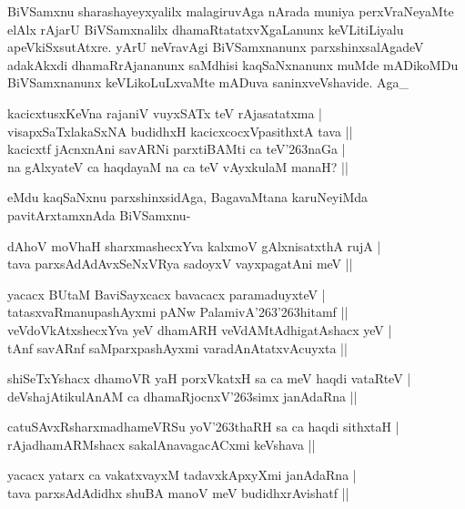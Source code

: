 \noindent
BiVSamxnu sharashayeyxyalilx malagiruvAga nArada muniya perxVraNeyaMte elAlx rAjarU BiVSamxnalilx dhamaRtatatxvXgaLanunx keVLitiLiyalu apeVkiSxsutAtxre. yArU neVravAgi BiVSamxnanunx parxshinxsalAgadeV adakAkxdi dhamaRrAjananunx saMdhisi kaqSaNxnanunx muMde mADikoMDu BiVSamxnanunx keVLikoLuLxvaMte mADuva saninxveVshavide. Aga\_

\begin{shloka}
kacicxtusxKeVna rajaniV vuyxSATx teV rAjasatatxma |\\\label{162}
visapxSaTxlakaSxNA budidhxH kacicxcocxVpasithxtA tava ||\\
kacicxtf jAcnxnAni savARNi parxtiBAMti ca teV\char'263naGa |\\
na gAlxyateV ca haqdayaM na ca teV vAyxkulaM manaH? ||
\end{shloka} 

\noindent
eMdu kaqSaNxnu parxshinxsidAga, BagavaMtana karuNeyiMda pavitArxtamxnAda BiVSamxnu-

\begin{shloka}
dAhoV moVhaH sharxmashecxYva kalxmoV gAlxnisatxthA rujA |\\
tava parxsAdAdAvxSeNxVRya sadoyxV vayxpagatAni meV ||
\end{shloka}

\begin{shloka}
yacacx BUtaM BaviSayxcacx bavacacx paramaduyxteV |\\
tatasxvaRmanupashAyxmi pANw PalamivA\char'263\char'263hitamf ||\\
veVdoVkAtxshecxYva yeV dhamARH veVdAMtAdhigatAshacx yeV |\\
tAnf savARnf saMparxpashAyxmi varadAnAtatxvAcuyxta ||
\end{shloka}

\begin{shloka}
shiSeTxYshacx dhamoVR yaH porxVkatxH sa ca meV haqdi vataRteV |\\
deVshajAtikulAnAM ca dhamaRjocnxV\char'263simx janAdaRna ||
\end{shloka}

\begin{shloka}
catuSAvxRsharxmadhameVRSu yoV\char'263thaRH sa ca haqdi sithxtaH |\\
rAjadhamARMshacx sakalAnavagacACxmi keVshava ||
\end{shloka}

\begin{shloka}
yacacx yatarx ca vakatxvayxM tadavxkApxyXmi janAdaRna |\\
tava parxsAdAdidhx shuBA manoV meV budidhxrAvishatf ||
\end{shloka}

